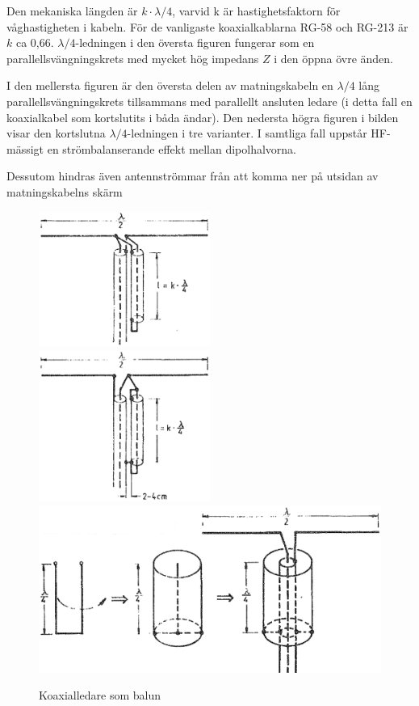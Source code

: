 Den mekaniska längden är \(k\cdot\lambda/4\), varvid k är
hastighetsfaktorn för våghastigheten i kabeln. För de vanligaste
koaxialkablarna RG-58 och RG-213 är \(k\) ca 0,66.
\(\lambda/4\)-ledningen i den översta figuren fungerar som en
parallellsvängningskrets med mycket hög impedans \(Z\) i den öppna
övre änden.

I den mellersta figuren är den översta delen av matningskabeln en
\(\lambda/4\) lång parallellsvängningskrets tillsammans med parallellt
ansluten ledare (i detta fall en koaxialkabel som kortslutits i båda
ändar). Den nedersta högra figuren i bilden visar den kortslutna
\(\lambda/4\)-ledningen i tre varianter. I samtliga fall uppstår
HF-mässigt en strömbalanserande effekt mellan dipolhalvorna.

Dessutom hindras även antennströmmar från att komma ner på utsidan av
matningskabelns skärm

\begin{figure}
  \includegraphics[width=0.5\textwidth]{images/cropped_pdfs/bild_2_6-30_1.pdf}
  \includegraphics[width=0.5\textwidth]{images/cropped_pdfs/bild_2_6-30_2.pdf}
  \includegraphics[width=\textwidth]{images/cropped_pdfs/bild_2_6-30_3.pdf}
  \caption{Koaxialledare som balun}
  \label{fig:bildII6-30}
\end{figure}

